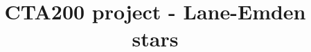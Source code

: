 \documentclass[linenumbers,trackchanges]{aastex701}
\begin{document}
\title{CTA200 project - Lane-Emden stars}

\end{document}
